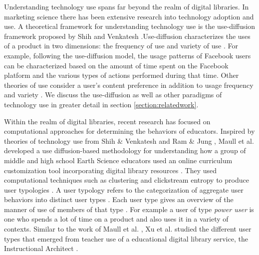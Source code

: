 \documentclass{acm_proc_article-sp}
\begin{document}
Understanding technology use spans far beyond the realm of digital libraries. In marketing science there has been extensive research into technology adoption and use. A  theoretical framework for understanding technology use is the use-diffusion framework proposed by Shih and Venkatesh \cite{shih2004beyond}.Use-diffusion characterizes the uses of a product in two dimensions: the frequency of use and variety of use \cite{shih2004beyond}.  For example, following the use-diffusion model, the usage patterns of Facebook users can be characterized based on the amount of time spent on the Facebook platform and the various types of actions performed during that time. Other theories of use consider a user's content preference in addition to usage frequency and variety \cite{brandtzaeg2010towards}. We discuss the use-diffusion as well as other paradigms of technology use in greater detail in section \ref{section:relatedwork}. 

Within the realm of digital libraries, recent research has focused on computational approaches for determining the behaviors of educators. Inspired by theories of technology use from Shih \& Venkatesh and Ram \& Jung \cite{shih2004beyond, ram1990conceptualization}, Maull et al. \cite{maullunderstanding} developed a use diffusion-based methodology for understanding how a group of middle and high school Earth Science educators used an online curriculum customization tool incorporating digital library resources \cite{maullunderstanding}. They used computational techniques such as clustering and clickstream entropy to produce user typologies \cite{maullunderstanding}. A user typology refers to the categorization of aggregate user behaviors into distinct user types \cite{brandtzaeg2010towards}. Each user type gives an overview of the manner of use of members of that type \cite{brandtzaeg2010towards}. For example a user of type \textit{power user} is one who spends a lot of time on a product and also uses it in a variety of contexts. Similar to the work of Maull et al. \cite{maullunderstanding}, Xu et al. studied the different  user types that emerged from teacher use of a educational digital library service, the Instructional Architect \cite{xu}. 
\end{document}
